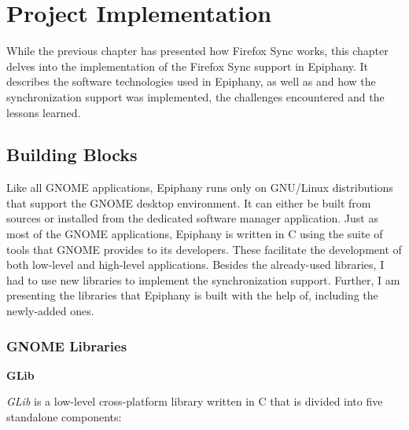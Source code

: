 \chapter{Project Implementation}
\label{chapter:project-implementation}

While the previous chapter has presented how Firefox Sync works, this chapter delves into the implementation of the Firefox Sync support in Epiphany. It describes the software technologies used in Epiphany, as well as and how the synchronization support was implemented, the challenges encountered and the lessons learned.

\section{Building Blocks}
\label{sec:building-blocks}

Like all GNOME applications, Epiphany runs only on GNU/Linux distributions that support the GNOME desktop environment. It can either be built from sources or installed from the dedicated software manager application. Just as most of the GNOME applications, Epiphany is written in C using the suite of tools that GNOME provides to its developers. These facilitate the development of both low-level and high-level applications. Besides the already-used libraries, I had to use new libraries to implement the synchronization support. Further, I am presenting the libraries that Epiphany is built with the help of, including the newly-added ones.

\subsection{GNOME Libraries}
\label{sub-sec:gnome-libraries}

\textbf{GLib}

\textit{GLib} is a low-level cross-platform library written in C that is divided into five standalone components:

